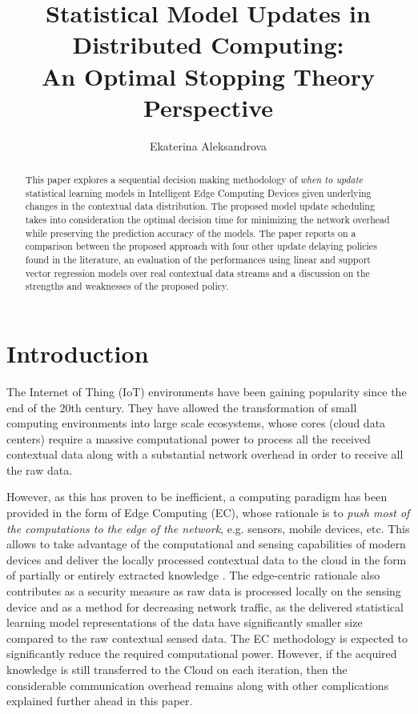\documentclass{mpaper}
\begin{document}
\title{Statistical Model Updates in Distributed Computing:\\ An Optimal Stopping Theory Perspective}
\author{Ekaterina Aleksandrova}

\maketitle

\begin{abstract}
This paper explores a sequential decision making methodology of \textit{when to update} statistical learning models in Intelligent Edge Computing Devices given underlying changes in the contextual data distribution. The proposed model update scheduling takes into consideration the optimal decision time for minimizing the network overhead while preserving the prediction accuracy of the models. The paper reports on a comparison between the proposed approach with four other update delaying policies found in the literature, an evaluation of the performances using linear and support vector regression models over real contextual data streams and a discussion on the strengths and weaknesses of the proposed policy.
\end{abstract}

\section{Introduction}
The Internet of Thing (IoT) environments have been gaining popularity since the end of the 20th century. They have allowed the transformation of small computing environments into large scale ecosystems, whose cores (cloud data centers) require a massive computational 
power to process all the received contextual data along with a substantial network overhead in order to receive all the raw data.

However, as this has proven to be inefficient, a computing paradigm has been provided in the form of Edge Computing (EC), whose rationale is to \textit{push most of the computations to the edge of the network}, e.g. sensors, mobile devices, etc. This allows to take advantage of the computational and sensing capabilities of modern devices and deliver the locally processed contextual data to the cloud in the form of partially or entirely extracted knowledge \cite{anagnostop2014}.
The edge-centric rationale also contributes as a security measure as raw data is processed locally on the sensing device and as a method for decreasing network traffic, as the delivered statistical learning model representations of the data have significantly smaller size compared to the raw contextual sensed data. The EC methodology is expected to significantly reduce the required computational power. However, if the acquired knowledge is still transferred to the Cloud on each iteration, then the considerable communication overhead remains along with other complications explained further ahead in this paper. 
\end{document}
